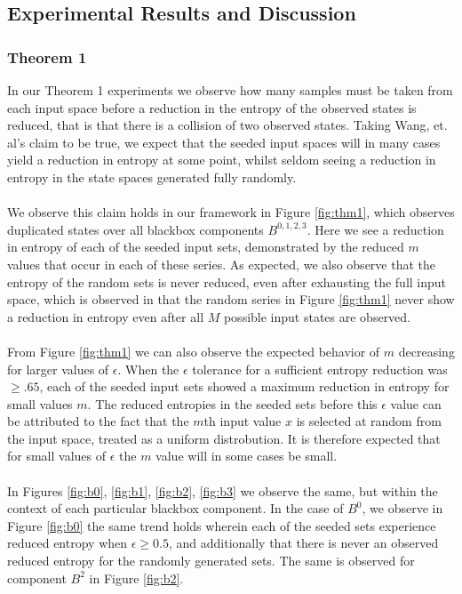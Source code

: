 \documentclass[letterpaper,twocolumn,10pt]{article}
\begin{document}
\subsection{Experimental Results and Discussion} 

\subsubsection{Theorem 1}

In our Theorem 1 experiments we observe how many samples must be taken from each input space before a reduction in the entropy of the observed states is reduced, that is that there is a collision of two observed states. Taking Wang, et. al's claim to be true, we expect that the seeded input spaces will in many cases yield a reduction in entropy at some point, whilst seldom seeing a reduction in entropy in the state spaces generated fully randomly. 
\\
\\
We observe this claim holds in our framework in Figure \ref{fig:thm1}, which observes duplicated states over all blackbox components $B^{0,1,2,3}$. Here we see a reduction in entropy of each of the seeded input sets, demonstrated by the reduced $m$ values that occur in each of these series. As expected, we also observe that the entropy of the random sets is never reduced, even after exhausting the full input space, which is observed in that the random series in Figure \ref{fig:thm1} never show a reduction in entropy even after all $M$ possible input states are observed. 
\\
\\
From Figure \ref{fig:thm1} we can also observe the expected behavior of $m$ decreasing for larger values of $\epsilon$. When the $\epsilon$ tolerance for a sufficient entropy reduction was $\geq .65$, each of the seeded input sets showed a maximum reduction in entropy for small values $m$. The reduced entropies in the seeded sets before this $\epsilon$ value can be attributed to the fact that the $m$th input value $x$ is selected at random from the input space, treated as a uniform distrobution. It is therefore expected that for small values of $\epsilon$ the $m$ value will in some cases be small.
\\
\\
In Figures \ref{fig:b0}, \ref{fig:b1}, \ref{fig:b2}, \ref{fig:b3} we observe the same, but within the context of each particular blackbox component. In the case of $B^0$, we observe in Figure \ref{fig:b0} the same trend holds wherein each of the seeded sets experience reduced entropy when $\epsilon \geq 0.5$, and additionally that there is never an observed reduced entropy for the randomly generated sets. The same is observed for component $B^2$ in Figure \ref{fig:b2}.
\end{document}
